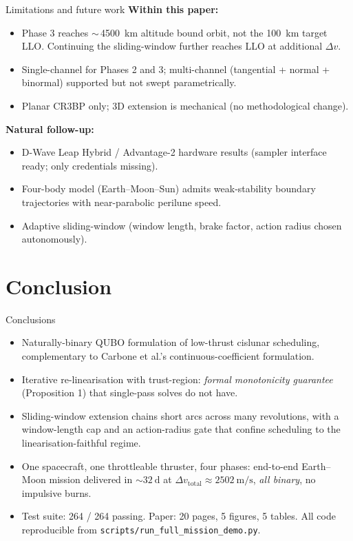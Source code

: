 \documentclass[10pt,aspectratio=169]{beamer}
\begin{document}
\begin{frame}{Limitations and future work}
\textbf{Within this paper:}
\begin{itemize}[itemsep=2pt]
  \item Phase 3 reaches $\sim$\,\SI{4500}{\km} altitude bound
    orbit, not the \SI{100}{\km} target LLO. Continuing the
    sliding-window further reaches LLO at additional $\Delta v$.
  \item Single-channel for Phases 2 and 3; multi-channel (tangential
    + normal + binormal) supported but not swept parametrically.
  \item Planar CR3BP only; 3D extension is mechanical (no
    methodological change).
\end{itemize}

\medskip
\textbf{Natural follow-up:}
\begin{itemize}[itemsep=2pt]
  \item D-Wave Leap Hybrid / Advantage-2 hardware results
    (sampler interface ready; only credentials missing).
  \item Four-body model (Earth--Moon--Sun) admits weak-stability
    boundary trajectories with near-parabolic perilune speed.
  \item Adaptive sliding-window (window length, brake factor,
    action radius chosen autonomously).
\end{itemize}
\end{frame}

\section{Conclusion}

\begin{frame}{Conclusions}
\begin{itemize}[itemsep=4pt]
  \item Naturally-binary QUBO formulation of low-thrust cislunar
    scheduling, complementary to Carbone et al.'s
    continuous-coefficient formulation.
  \item Iterative re-linearisation with trust-region: \emph{formal
    monotonicity guarantee} (Proposition 1) that single-pass
    solves do not have.
  \item Sliding-window extension chains short arcs across many
    revolutions, with a window-length cap and an action-radius
    gate that confine scheduling to the linearisation-faithful
    regime.
  \item One spacecraft, one throttleable thruster, four phases:
    end-to-end Earth--Moon mission delivered in
    $\sim\!\SI{32}{\day}$ at
    $\Delta v_\mathrm{total} \approx
    \SI{2502}{\meter\per\second}$,
    \emph{all binary}, no impulsive burns.
  \item Test suite: 264 / 264 passing. Paper: 20 pages, 5 figures,
    5 tables. All code reproducible from
    \texttt{scripts/run\_full\_mission\_demo.py}.
\end{itemize}
\end{frame}
\end{document}
